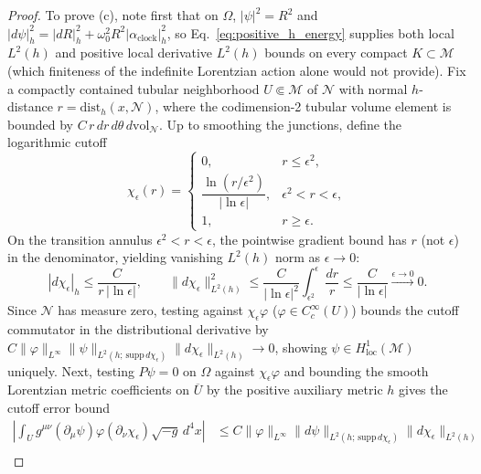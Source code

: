 \documentclass[11pt, a4paper]{article}
\theoremstyle{definition}
\begin{document}
\begin{proof}
To prove (c), note first that on $\Omega$, $|\psi|^2 = R^2$ and $|d\psi|_h^2 = |dR|_h^2 + \omega_0^2 R^2 |\alpha_{\text{clock}}|_h^2$, so Eq.~\eqref{eq:positive_h_energy} supplies both local $L^2(h)$ and positive local derivative $L^2(h)$ bounds on every compact $K \subset \mathcal{M}$ (which finiteness of the indefinite Lorentzian action alone would not provide). Fix a compactly contained tubular neighborhood $U \Subset \mathcal{M}$ of $\mathcal{N}$ with normal $h$-distance $r = \text{dist}_h(x, \mathcal{N})$, where the codimension-2 tubular volume element is bounded by $C\,r\,dr\,d\theta\,d\mathrm{vol}_{\mathcal{N}}$. Up to smoothing the junctions, define the logarithmic cutoff
\begin{equation}
\label{eq:log_cutoff_wallstrom}
\chi_\epsilon(r) = \begin{cases} 0, & r \le \epsilon^2, \\ \dfrac{\ln(r/\epsilon^2)}{|\ln\epsilon|}, & \epsilon^2 < r < \epsilon, \\ 1, & r \ge \epsilon. \end{cases}
\end{equation}
On the transition annulus $\epsilon^2 < r < \epsilon$, the pointwise gradient bound has $r$ (not $\epsilon$) in the denominator, yielding vanishing $L^2(h)$ norm as $\epsilon \to 0$:
\begin{equation}
\label{eq:log_cutoff_l2_bound}
|d\chi_\epsilon|_h \le \frac{C}{r\,|\ln\epsilon|}, \qquad \|d\chi_\epsilon\|_{L^2(h)}^2 \le \frac{C}{|\ln\epsilon|^2}\int_{\epsilon^2}^{\epsilon}\frac{dr}{r} \le \frac{C}{|\ln\epsilon|} \xrightarrow{\epsilon \to 0} 0.
\end{equation}
Since $\mathcal{N}$ has measure zero, testing against $\chi_\epsilon \varphi$ ($\varphi \in C_c^\infty(U)$) bounds the cutoff commutator in the distributional derivative by $C\|\varphi\|_{L^\infty}\|\psi\|_{L^2(h;\,\mathrm{supp}\,d\chi_\epsilon)}\|d\chi_\epsilon\|_{L^2(h)} \to 0$, showing $\psi \in H^1_{\text{loc}}(\mathcal{M})$ uniquely. Next, testing $P\psi = 0$ on $\Omega$ against $\chi_\epsilon\varphi$ and bounding the smooth Lorentzian metric coefficients on $\overline{U}$ by the positive auxiliary metric $h$ gives the cutoff error bound
\begin{equation}
\label{eq:weak_pde_cutoff_bound}
\begin{aligned}
\left| \int_U g^{\mu\nu}(\partial_\mu \psi)\varphi(\partial_\nu \chi_\epsilon)\sqrt{-g}\,d^4x \right| &\le C\|\varphi\|_{L^\infty} \|d\psi\|_{L^2(h;\,\mathrm{supp}\,d\chi_\epsilon)} \|d\chi_\epsilon\|_{L^2(h)} \\

\end{aligned}
\end{equation}
\end{proof}
\end{document}
